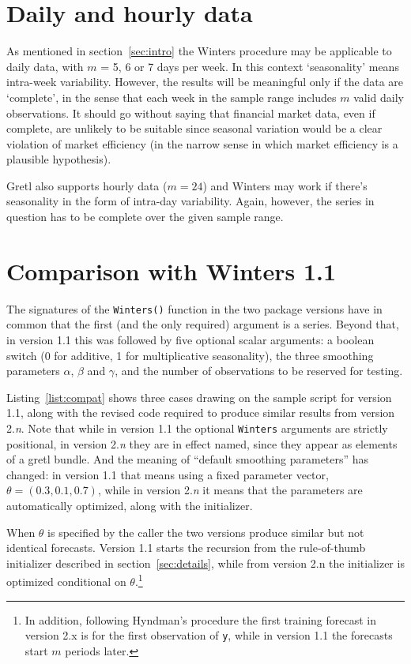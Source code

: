 \documentclass{article}
\begin{document}
\section{Daily and hourly data}
\label{sec:daily}

As mentioned in section~\ref{sec:intro} the Winters procedure may be
applicable to daily data, with $m$ = 5, 6 or 7 days per week. In this
context `seasonality' means intra-week variability. However, the results
will be meaningful only if the data are `complete', in the sense that
each week in the sample range includes $m$ valid daily observations. It
should go without saying that financial market data, even if complete,
are unlikely to be suitable since seasonal variation would be a clear
violation of market efficiency (in the narrow sense in which market
efficiency is a plausible hypothesis).

Gretl also supports hourly data ($m=24$) and Winters may work if there's
seasonality in the form of intra-day variability. Again, however, the
series in question has to be complete over the given sample range.

\section{Comparison with Winters 1.1}
\label{sec:update}

The signatures of the \texttt{Winters()} function in the two package
versions have in common that the first (and the only required) argument
is a series. Beyond that, in version 1.1 this was followed by five
optional scalar arguments: a boolean switch (0 for additive, 1 for
multiplicative seasonality), the three smoothing parameters $\alpha$,
$\beta$ and $\gamma$, and the number of observations to be reserved for
testing.

Listing~\ref{list:compat} shows three cases drawing on the sample script
for version 1.1, along with the revised code required to produce similar
results from version 2.\textit{n}. Note that while in version 1.1 the
optional \texttt{Winters} arguments are strictly positional, in version
2.\textit{n} they are in effect named, since they appear as elements of
a gretl bundle. And the meaning of ``default smoothing parameters'' has
changed: in version 1.1 that means using a fixed parameter vector,
$\theta = (0.3, 0.1, 0.7)$, while in version 2.\textit{n} it means that
the parameters are automatically optimized, along with the initializer.

When $\theta$ is specified by the caller the two versions produce
similar but not identical forecasts. Version 1.1 starts the recursion
from the rule-of-thumb initializer described in
section~\ref{sec:details}, while from version 2.n the initializer is
optimized conditional on $\theta$.\footnote{In addition, following
  Hyndman's procedure the first training forecast in version 2.x is for
  the first observation of \texttt{y}, while in version 1.1 the
  forecasts start $m$ periods later.}
\end{document}
